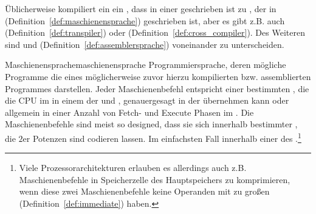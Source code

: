 Üblicherweise kompiliert ein  ein , dass in einer  geschrieben ist zu , der in  (Definition~\ref{def:maschienensprache}) geschrieben ist, aber es gibt z.B. auch  (Definition~\ref{def:transpiler}) oder  (Definition~\ref{def:cross_compiler}). Des Weiteren sind  und  (Definition~\ref{def:assemblersprache}) voneinander zu unterscheiden.

\begin{Definition}{Maschienensprache}{maschienensprache}
  Programmiersprache, deren mögliche Programme die  eines möglicherweise zuvor hierzu kompilierten bzw. assemblierten Programmes darstellen. Jeder Maschienenbefehl entspricht einer bestimmten , die die CPU im  in einem  der  und , genauergesagt in der  übernehmen kann oder allgemein in einer  Anzahl von Fetch- und Execute Phasen im . Die Maschienenbefehle sind meist so designed, dass sie sich innerhalb bestimmter , die $2$er Potenzen sind codieren lassen. Im einfachsten Fall innerhalb einer  des .\footnote{Viele Prozessorarchitekturen erlauben es allerdings auch z.B.  Maschienenbefehle in  Speicherzelle des Hauptspeichers zu komprimieren, wenn diese zwei Maschienenbefehle keine Operanden mit zu großen  (Definition~\ref{def:immediate}) haben.}
\end{Definition}

